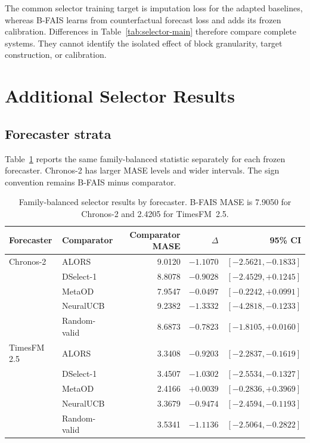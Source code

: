 The common selector training target is imputation loss for the adapted baselines, whereas B-FAIS learns from counterfactual forecast loss and adds its frozen calibration. Differences in Table~\ref{tab:selector-main} therefore compare complete systems. They cannot identify the isolated effect of block granularity, target construction, or calibration.

\section{Additional Selector Results}
\label{app:stratified-results}

\subsection{Forecaster strata}

Table~\ref{tab:forecaster-strata} reports the same family-balanced statistic separately for each frozen forecaster. Chronos-2 has larger MASE levels and wider intervals. The sign convention remains B-FAIS minus comparator.

\begin{table}[h]
\centering
\small
\caption{Family-balanced selector results by forecaster. B-FAIS MASE is 7.9050 for Chronos-2 and 2.4205 for TimesFM~2.5.}
\label{tab:forecaster-strata}
\begin{tabular}{llrrr}
\toprule
Forecaster & Comparator & Comparator MASE & $\Delta$ & 95\% CI \\
\midrule
Chronos-2 & ALORS & 9.0120 & $-1.1070$ & $[-2.5621,-0.1833]$ \\
 & DSelect-1 & 8.8078 & $-0.9028$ & $[-2.4529,+0.1245]$ \\
 & MetaOD & 7.9547 & $-0.0497$ & $[-0.2242,+0.0991]$ \\
 & NeuralUCB & 9.2382 & $-1.3332$ & $[-4.2818,-0.1233]$ \\
 & Random-valid & 8.6873 & $-0.7823$ & $[-1.8105,+0.0160]$ \\
\midrule
TimesFM 2.5 & ALORS & 3.3408 & $-0.9203$ & $[-2.2837,-0.1619]$ \\
 & DSelect-1 & 3.4507 & $-1.0302$ & $[-2.5534,-0.1327]$ \\
 & MetaOD & 2.4166 & $+0.0039$ & $[-0.2836,+0.3969]$ \\
 & NeuralUCB & 3.3679 & $-0.9474$ & $[-2.4594,-0.1193]$ \\
 & Random-valid & 3.5341 & $-1.1136$ & $[-2.5064,-0.2822]$ \\
\bottomrule
\end{tabular}
\end{table}

